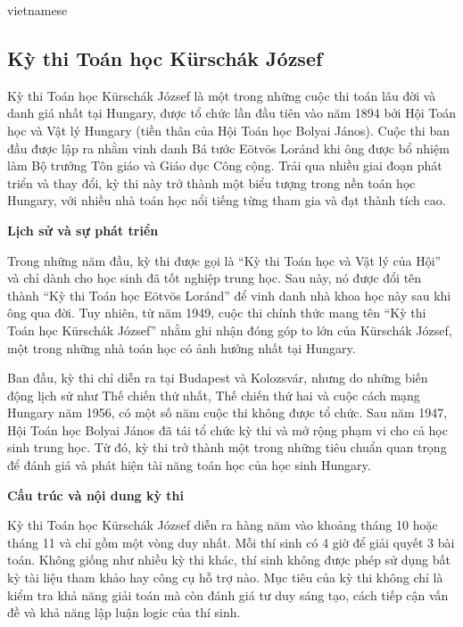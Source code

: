 \documentclass{article}
\begin{document}
\begin{otherlanguage*}{vietnamese}
\newpage

\subsection{Kỳ thi Toán học Kürschák József}

Kỳ thi Toán học Kürschák József là một trong những cuộc thi toán lâu đời và danh giá nhất tại Hungary,
được tổ chức lần đầu tiên vào năm 1894 bởi Hội Toán học và Vật lý Hungary (tiền thân của Hội Toán học Bolyai János).
Cuộc thi ban đầu được lập ra nhằm vinh danh Bá tước Eötvös Loránd khi ông được bổ nhiệm làm Bộ trưởng Tôn giáo và Giáo dục Công cộng.
Trải qua nhiều giai đoạn phát triển và thay đổi, kỳ thi này trở thành một biểu tượng trong nền toán học Hungary, với nhiều nhà toán học nổi tiếng từng tham gia và đạt thành tích cao.

\textbf{Lịch sử và sự phát triển}

Trong những năm đầu, kỳ thi được gọi là “Kỳ thi Toán học và Vật lý của Hội” và chỉ dành cho học sinh đã tốt nghiệp trung học.
Sau này, nó được đổi tên thành “Kỳ thi Toán học Eötvös Loránd” để vinh danh nhà khoa học này sau khi ông qua đời.
Tuy nhiên, từ năm 1949, cuộc thi chính thức mang tên “Kỳ thi Toán học Kürschák József” nhằm ghi nhận đóng góp to lớn của Kürschák József,
một trong những nhà toán học có ảnh hưởng nhất tại Hungary.

Ban đầu, kỳ thi chỉ diễn ra tại Budapest và Kolozsvár, nhưng do những biến động lịch sử như Thế chiến thứ nhất,
Thế chiến thứ hai và cuộc cách mạng Hungary năm 1956, có một số năm cuộc thi không được tổ chức.
Sau năm 1947, Hội Toán học Bolyai János đã tái tổ chức kỳ thi và mở rộng phạm vi cho cả học sinh trung học.
Từ đó, kỳ thi trở thành một trong những tiêu chuẩn quan trọng để đánh giá và phát hiện tài năng toán học của học sinh Hungary.

\textbf{Cấu trúc và nội dung kỳ thi}

Kỳ thi Toán học Kürschák József diễn ra hàng năm vào khoảng tháng 10 hoặc tháng 11 và chỉ gồm một vòng duy nhất. Mỗi thí sinh có 4 giờ để giải quyết 3 bài toán.
Không giống như nhiều kỳ thi khác, thí sinh không được phép sử dụng bất kỳ tài liệu tham khảo hay công cụ hỗ trợ nào.
Mục tiêu của kỳ thi không chỉ là kiểm tra khả năng giải toán mà còn đánh giá tư duy sáng tạo, cách tiếp cận vấn đề và khả năng lập luận logic của thí sinh.


\end{otherlanguage*}
\end{document}
